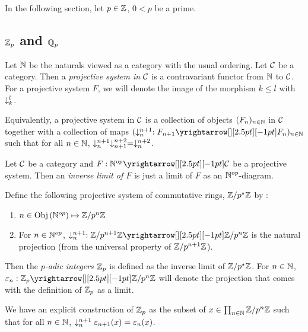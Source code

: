 In the following section, let $p \in \mathbb{Z}$, $0 < p$ be a prime. 

\subsection{$\mathbb{Z}_p$ and $\mathbb{Q}_p$}

\begin{dfn}
  
  Let $\mathbb{N}$ be the naturals viewed as a category with the usual ordering. 
  Let $\mathcal{C}$ be a category. 
  Then a \emph{projective system in $\mathcal{C}$} is a contravariant functor 
  from $\mathbb{N}$ to $\mathcal{C}$. 
  For a projective system $F$, 
  we will denote the image of the morphism $k \leq l$ with $\downarrow_{k}^{l}$. 

  Equivalently, 
  a projective system in $\mathcal{C}$ is 
  a collection of objects $(F_n)_{n\in\mathbb{N}}$ in $\mathcal{C}$ together with
  a collection of maps $(\fall{n}{n+1} : \map{F_{n+1}}{F_n}{}{})_{n\in \N}$
  such that for all $n \in \mathbb{N}$, $\downarrow_{n}^{n+1}\downarrow_{n+1}^{n+2} = \downarrow_{n}^{n+2}$.
\end{dfn}

\begin{dfn}
  
  Let $\mathcal{C}$ be a category and $F : \map{\N\op}{\CC}{}{}$ be a projective system.
  Then an \emph{inverse limit of $F$} is just 
  a limit of $F$ as an $\mathbb{N}^{op}$-diagram.
\end{dfn}

\begin{dfn}
  
  Define the following projective system of commutative rings, 
  $\mathbb{Z}/p^\star\mathbb{Z}$ by : 
  \begin{enumerate}
    \item $n \in \mathrm{Obj}\left(\mathbb{N}^{op}\right) \mapsto \mathbb{Z}/p^n\mathbb{Z}$
    \item For $n \in \mathbb{N}^{op}$, $\fall{n}{n+1} : \map{\Z/p^{n+1}\Z}{\Z/p^n\Z}{}{}$
    is the natural projection (from the universal property of $\mathbb{Z}/p^{n+1}\mathbb{Z}$). 
  \end{enumerate}
  Then the \emph{$p$-adic integers} $\mathbb{Z}_p$ is defined as 
  the inverse limit of $\mathbb{Z}/p^\star\mathbb{Z}$. 
  For $n \in \mathbb{N}$, $\ep_n : \map{\Z_p}{\Z/p^n\Z}{}{}$ will denote the 
  projection that comes with the definition of $\mathbb{Z}_p$ as a limit. 

  We have an explicit construction of $\mathbb{Z}_p$ as 
  the subset of $x \in \prod_{n\in\mathbb{N}}^{} \mathbb{Z}/p^n\mathbb{Z}$ such that 
  for all $n \in \mathbb{N}$, $\downarrow_{n}^{n+1}\varepsilon_{n+1}(x) = \varepsilon_n(x)$.
\end{dfn}

